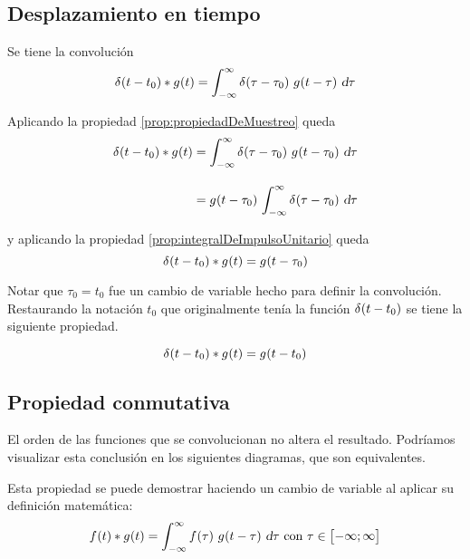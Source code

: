 \subsection{Desplazamiento en tiempo}

Se tiene la convolución
\[
    \fx[\delta]{t - t_0} * \fx[g]{t}
    = \int_{-\infty}^\infty \fx[\delta]{\tau - \tau_0} \, \fx[g]{t - \tau} \, \dif \tau
\]

Aplicando la propiedad \ref{prop:propiedadDeMuestreo} queda
\begin{align*}
    \fx[\delta]{t - t_0} * \fx[g]{t}
    & = \int_{-\infty}^\infty \fx[\delta]{\tau - \tau_0} \, \fx[g]{t - \tau_0} \, \dif \tau
    \\[1em]
    & = \fx[g]{t - \tau_0} \, \int_{-\infty}^\infty \fx[\delta]{\tau - \tau_0} \, \dif \tau
\end{align*}

y aplicando la propiedad \ref{prop:integralDeImpulsoUnitario} queda
\[
    \fx[\delta]{t - t_0} * \fx[g]{t}
    = \fx[g]{t - \tau_0}
\]

Notar que $\tau_0 = t_0$ fue un cambio de variable hecho para definir la convolución.
Restaurando la notación $t_0$ que originalmente tenía la función $\fx[\delta]{t - t_0}$ se tiene la siguiente propiedad.

\begin{mdframed}[style=PropertyFrame]
    \begin{prop}
    \end{prop}
    \[
        \fx[\delta]{t - t_0} * \fx[g]{t} = \fx[g]{t - t_0}
    \]
\end{mdframed}

\subsection{Propiedad conmutativa}

El orden de las funciones que se convolucionan no altera el resultado.
Podríamos visualizar esta conclusión en los siguientes diagramas, que son equivalentes.

\begin{center}
    \def\svgwidth{0.4\linewidth}
    
\end{center}

Esta propiedad se puede demostrar haciendo un cambio de variable al aplicar su definición matemática:
\[
    \fx{t} * \fx[g]{t}
    = \convol[g]{f}
    \text{ con } \tau \in \inBrackets{-\infty; \infty}
\]

